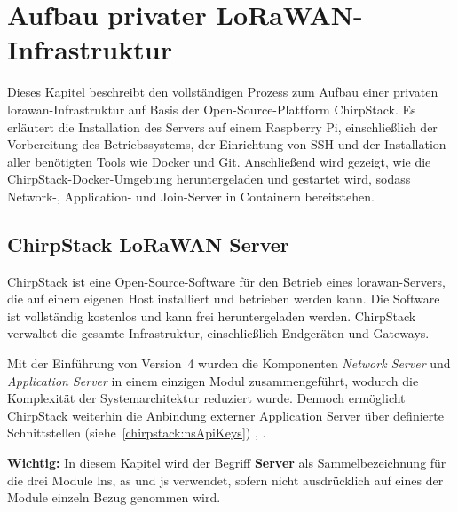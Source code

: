%
%

\chapter{Aufbau privater LoRaWAN-Infrastruktur}

	Dieses Kapitel beschreibt den vollständigen Prozess zum Aufbau einer privaten \ac{lorawan}-Infrastruktur auf Basis der Open-Source-Plattform ChirpStack. Es erläutert die Installation des Servers auf einem Raspberry Pi, einschließlich der Vorbereitung des Betriebssystems, der Einrichtung von SSH und der Installation aller benötigten Tools wie Docker und Git. Anschließend wird gezeigt, wie die ChirpStack-Docker-Umgebung heruntergeladen und gestartet wird, sodass Network-, Application- und Join-Server in Containern bereitstehen.
	
\section{ChirpStack LoRaWAN Server \label{LNS:ChirpstackGeneral}}
	ChirpStack ist eine Open-Source-Software für den Betrieb eines \ac{lorawan}-Servers, die auf einem eigenen Host installiert und betrieben werden kann. Die Software ist vollständig kostenlos und kann frei heruntergeladen werden. ChirpStack verwaltet die gesamte Infrastruktur, einschlie{\ss}lich Endgeräten und Gateways.
	
	Mit der Einführung von Version~4 wurden die Komponenten \emph{Network Server} und \emph{Application Server} in einem einzigen Modul zusammengeführt, wodurch die Komplexität der Systemarchitektur reduziert wurde. Dennoch ermöglicht ChirpStack weiterhin die Anbindung externer Application Server über definierte Schnittstellen (siehe~\ref{chirpstack:nsApiKeys}) \cite{ChirpStack:2022d}, \cite{Garcia:2025b}.
	
	\vspace{0.5cm}

	\textbf{Wichtig:} In diesem Kapitel wird der Begriff \textbf{Server} als Sammelbezeichnung für die drei Module \ac{lns}, \ac{as} und \ac{js} verwendet, sofern nicht ausdrücklich auf eines der Module einzeln Bezug genommen wird.
	
	\vspace{0.5cm}
	
